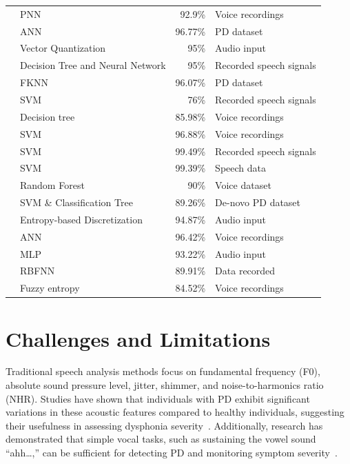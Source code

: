 \documentclass{paper}
\begin{document}
\begin{table}[H]
{\begin{tabular}{l|l|r|l}
            \citet{can2013diagnosis} & PNN & 92.9\% & Voice recordings \\
            \citet{ccauglar2010automatic} & ANN & 96.77\% & PD dataset \\
            \citet{kapoor2011parkinson} & Vector Quantization & 95\% & Audio input \\
            \citet{wu2011data} & Decision Tree and Neural Network & 95\% & Recorded speech signals \\
            \citet{chen2013efficient} & FKNN & 96.07\% & PD dataset \\
            \citet{yadav2012predication} & SVM & 76\% & Recorded speech signals \\
            \citet{azad2013design} & Decision tree & 85.98\% & Voice recordings \\
            \citet{bouchikhi2013parkinson} & SVM & 96.88\% & Voice recordings \\
            \citet{ma2014efficient} & SVM & 99.49\% & Recorded speech signals \\
            \citet{hazan2012early} & SVM & 99.39\% & Speech data \\
            \citet{sriram2013intelligent} & Random Forest & 90\% & Voice dataset \\
            \citet{prashanth2014parkinson} & SVM \& Classification Tree & 89.26\% & De-novo PD dataset \\
            \citet{kaya2011effect} & Entropy-based Discretization & 94.87\% & Audio input \\
            \citet{nivedita2013artificial} & ANN & 96.42\% & Voice recordings \\
            \citet{gharehchopogh2013case} & MLP & 93.22\% & Audio input \\
            \citet{wu2010prediction} & RBFNN & 89.91\% & Data recorded \\
            \citet{luukka2011feature} & Fuzzy entropy & 84.52\% & Voice recordings \\
            \hline
        \end{tabular}
    }
\end{table}

\section{Challenges and Limitations}
Traditional speech analysis methods focus on fundamental frequency (F0), absolute sound pressure level, jitter, shimmer, and noise-to-harmonics ratio (NHR). Studies have shown that individuals with PD exhibit significant variations in these acoustic features compared to healthy individuals, suggesting their usefulness in assessing dysphonia severity~\cite{baken1987clinical, zwirner1991phonatory}. Additionally, research has demonstrated that simple vocal tasks, such as sustaining the vowel sound “ahh…,” can be sufficient for detecting PD and monitoring symptom severity~\cite{little2008suitability, titze2000, tsanas2009accurate, tsanas2011nonlinear}.
\end{document}
